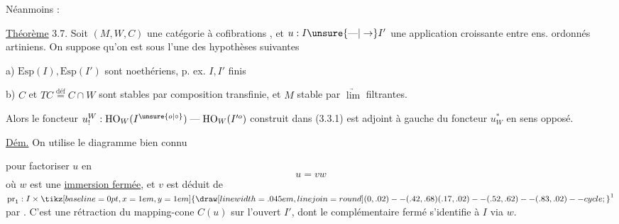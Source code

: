 
Néanmoins :

\uline{Théorème} 3.7. Soit $(M,W,C)$ une catégorie à
cofibrations , et $u:I\unsure{\text{---}|\to}I'$ une application
croissante entre ens. ordonnés artiniens.
On suppose qu'on est sous l'une des
hypothèses suivantes

a) $\mathrm{Esp}(I),\mathrm{Esp}(I')$ sont noethériens, p. ex.
$I,I'$ finis

b) $C$ et $TC\overset{\mathrm{déf}}{=}C\cap W$ sont stables par composition
transfinie, et $M$ stable par  $\underrightarrow{\lim}$ filtrantes.

Alors le foncteur $u_!^W:\mathrm{HO}_W(I^{\unsure{o|\circ}})\mathrel{\text{---}}\mathrm{HO}_W(I'^o)$
construit dans (3.3.1) est adjoint à gauche
du foncteur $u_W^*$ en sens opposé.

\uline{Dém.} On utilise le diagramme bien
connu


pour factoriser $u$ en
\[
u=vw
\]
où $w$ est une \uline{immersion fermée},
et $v$ est déduit de $\mathrm{pr}_1:I\times\mathord{\tikz[baseline=0pt,x=1em,y=1em]{\draw[line width=.045em,line join=round] (0,.02)--(.42,.68) (.17,.02)--(.52,.62)--(.83,.02)--cycle;}}^1$ par
. C'est une rétraction du
mapping-cone $C(u)$ sur l'ouvert $I'$, dont
le complémentaire fermé s'identifie à $I$ via $w$.
